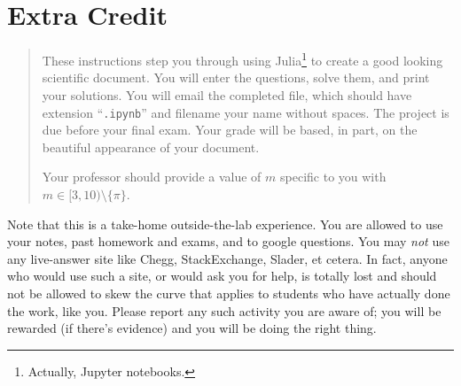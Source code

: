 \documentclass[12pt,answers]{book}
\begin{document}
\chapter{Extra Credit}
\begin{quote}
  These instructions step you through using Julia\footnote{Actually, Jupyter notebooks.} to create a good looking scientific document. You will enter the questions, solve them, and print your solutions. You will email the completed file, which should have extension ``{\tt .ipynb}'' and filename your name without spaces. The project is due before your final exam. Your grade will be based, in part, on the beautiful appearance of your document.

  Your professor should provide a value of $m$ specific to you with $m\in [3,10)\setminus\{\pi\}$.
\end{quote}

Note that this is a take-home outside-the-lab experience. You are allowed to use your notes, past homework and  exams, and to google questions.  You may \emph{not} use any live-answer site like Chegg, StackExchange, Slader, et cetera. In fact, anyone  who would use such a site, or would ask you for help, is totally lost and should not be allowed to skew the curve that applies to students who have actually done the work, like you. Please report any such activity you are aware of; you will be rewarded (if there's evidence) and you will be doing the right thing.
\end{document}

